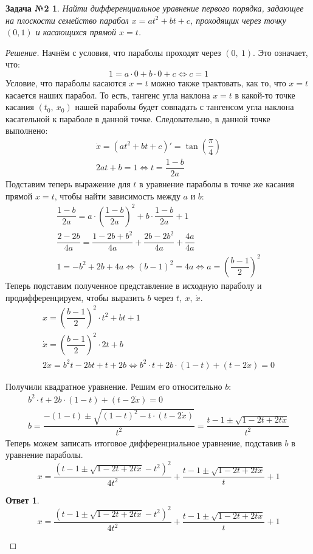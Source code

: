 \documentclass[a4paper,12pt]{article}
\newtheorem*{task2}{Задача №2}
\newtheorem*{ans}{Ответ}
\newcommand{\dx}{\dot{x}}
\begin{document}
\begin{task2}
	Найти дифференциальное уравнение первого порядка, задающее на плоскости семейство парабол
	$x = at^2 + bt + c$, проходящих через 
	точку $(0,1)$ и касающихся прямой $x = t$. 
\end{task2}
\begin{proof}[Решение]
	Начнём с условия, что параболы проходят через $(0,\ 1)$. Это означает, что:
	\[1 = a\cdot 0 + b \cdot 0 + c \iff c = 1\]
	Условие, что параболы касаются $x = t$ можно также трактовать, как то, что $x = t$ касается наших парабол. То есть, тангенс угла наклона $x = t$ в какой-то точке касания $(t_0,\ x_0)$ нашей параболы будет совпадать с тангенсом угла наклона $\textbf{касательной}$ к параболе в данной точке. Следовательно, в данной точке выполнено:
	\begin{gather*}
	\dx = (at^2 + bt + c)' = \tan(\dfrac{\pi}{4})\\
	2at + b = 1 \iff t = \dfrac{1 - b}{2a}
	\end{gather*}
	Подставим теперь выражение для $t$ в уравнение параболы в точке же касания прямой $x = t$, чтобы найти зависимость между $a$ и $b$:
	\begin{gather*}
	\dfrac{1 - b}{2a} = a \cdot \left(\dfrac{1 - b}{2a}\right)^2 + b\cdot \dfrac{1 - b}{2a} + 1\\
	\dfrac{2 - 2b}{4a} = \dfrac{1 - 2b + b^2}{4a} + \dfrac{2b - 2b^2}{4a} + \dfrac{4a}{4a}\\
	1 = -b^2 + 2b + 4a \iff (b - 1)^2 = 4a \iff a = \left(\dfrac{b - 1}{2}\right)^2
	\end{gather*}
	Теперь подставим полученное представление в исходную параболу и продифференцируем, чтобы выразить $b$ через $t,\ x,\ \dx$.
	\begin{gather*}
	x = \left(\dfrac{b - 1}{2}\right)^2 \cdot t^2 + bt + 1\\
	\dx = \left(\dfrac{b - 1}{2}\right)^2 \cdot 2t + b\\
	2\dx = b^2t - 2bt + t + 2b \iff b^2 \cdot t + 2b \cdot (1 - t) + (t - 2\dx) = 0
	\end{gather*}
	
	Получили квадратное уравнение. Решим его относительно $b$:
	\begin{gather*}
	b^2 \cdot t + 2b \cdot (1 - t) + (t - 2\dx) = 0\\
	b = \dfrac{-(1 - t) \pm \sqrt{(1 - t)^2 - t\cdot (t - 2\dx)}}{t^2} = \dfrac{t - 1 \pm \sqrt{1 - 2t + 2t\dx}}{t^2}
	\end{gather*}
	Теперь можем записать итоговое дифференциальное уравнение, подставив $b$ в уравнение параболы.
	\[x = \dfrac{\left(t - 1 \pm \sqrt{1 - 2t + 2t\dx} - t^2\right)^2}{4t^2} + \dfrac{t - 1 \pm \sqrt{1 - 2t + 2t\dx}}{t} + 1\]
	\begin{ans}
		\[x = \dfrac{\left(t - 1 \pm \sqrt{1 - 2t + 2t\dx} - t^2\right)^2}{4t^2} + \dfrac{t - 1 \pm \sqrt{1 - 2t + 2t\dx}}{t} + 1\]
	\end{ans}
\end{proof}
\end{document}
